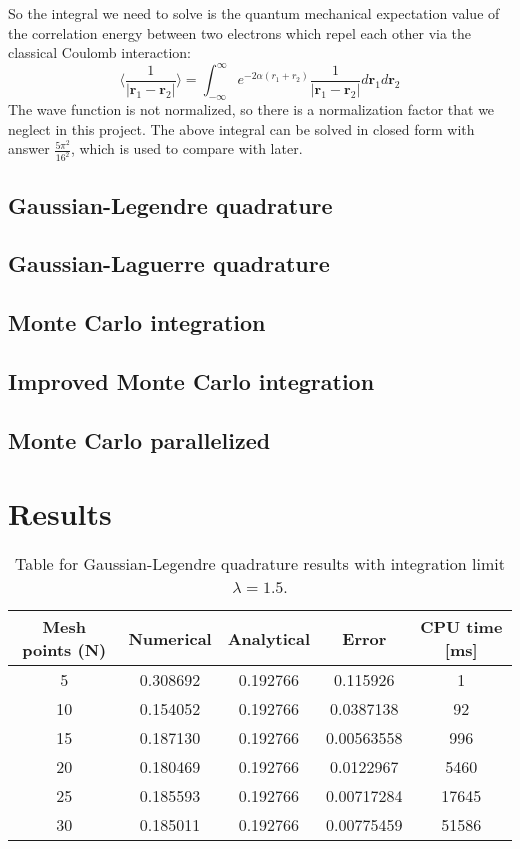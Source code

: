 \documentclass[12pt,a4paper,english]{article}
\begin{document}
So the integral we need to solve is the quantum mechanical expectation value of the correlation energy between two electrons which repel each other via the classical Coulomb interaction:
\begin{equation}
\langle\frac{1}{|\textbf{r}_1-\textbf{r}_2|}\rangle=\int_{-\infty}^{\infty}e^{-2\alpha(r_1+r_2)}\frac{1}{|\textbf{r}_1-\textbf{r}_2|}d\textbf{r}_1d\textbf{r}_2
\end{equation}
The wave function is not normalized, so there is a normalization factor that we neglect in this project. The above integral can be solved in closed form with answer $\frac{5\pi^2}{16^2}$, which is used to compare with later.

\subsection{Gaussian-Legendre quadrature}
\subsection{Gaussian-Laguerre quadrature}
\subsection{Monte Carlo integration}
\subsection{Improved Monte Carlo integration}
\subsection{Monte Carlo parallelized}
\section{Results}


\begin{table}[htbp]
	\centering
	\begin{tabular}{ |c|c|c|c|c| }
		\hline \rule{0pt}{13pt}
		Mesh points (N) & Numerical & Analytical & Error & CPU time [ms]\\
		\hline \rule{0pt}{13pt}
		5 & 0.308692 & 0.192766 & 0.115926 & 1 \\
		\hline \rule{0pt}{13pt}
		10 & 0.154052 & 0.192766 & 0.0387138 & 92 \\
		\hline \rule{0pt}{13pt}
		15 & 0.187130 & 0.192766 & 0.00563558 & 996 \\
		\hline \rule{0pt}{13pt}
		20 & 0.180469 & 0.192766 & 0.0122967 & 5460 \\
		\hline \rule{0pt}{13pt}
		25 & 0.185593 & 0.192766 & 0.00717284 & 17645 \\
		\hline \rule{0pt}{13pt}
		30 & 0.185011 & 0.192766 & 0.00775459 & 51586 \\
		\hline 
	\end{tabular}	
	\caption{Table for Gaussian-Legendre quadrature results with integration limit $\lambda=1.5$.}
	\label{tab:Gauss_Leg}
\end{table}
\end{document}
